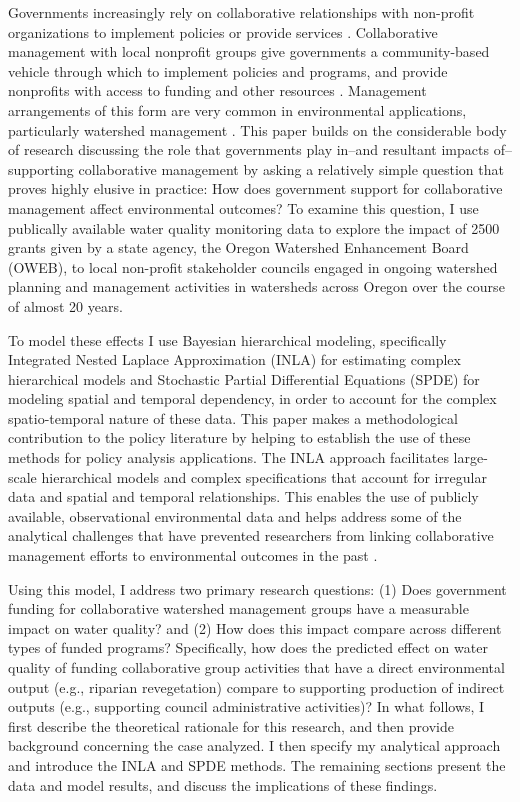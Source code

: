 \documentclass[11pt,a4paper,titlepage]{article}
\begin{document}
Governments increasingly rely on collaborative relationships with non-profit organizations to implement policies or provide services \parencite{salamon2002}. Collaborative management with local nonprofit groups give governments a community-based vehicle through which to implement policies and programs, and provide nonprofits with access to funding and other resources \parencite{nikolic2008}. Management arrangements of this form are very common in environmental applications, particularly watershed management \parencite[e.g.,][]{leach2013,leach2002,margerum2011}. This paper builds on the considerable body of research discussing the role that governments play in--and resultant impacts of--supporting collaborative management \parencite[e.g.,][]{nikolic2008,lubell2008,ansell2008,emerson2012} by asking a relatively simple question that proves highly elusive in practice: How does government support for collaborative management affect environmental outcomes? To examine this question, I use publically available water quality monitoring data to explore the impact of 2500 grants given by a state agency, the Oregon Watershed Enhancement Board (OWEB), to local non-profit stakeholder councils engaged in ongoing watershed planning and management activities in watersheds across Oregon over the course of almost 20 years.

To model these effects I use Bayesian hierarchical modeling, specifically Integrated Nested Laplace Approximation (INLA) \parencite{rue2009} for estimating complex hierarchical models and Stochastic Partial Differential Equations (SPDE) \parencite{lindgren2011} for modeling spatial and temporal dependency, in order to account for the complex spatio-temporal nature of these data. This paper makes a methodological contribution to the policy literature by helping to establish the use of these methods for policy analysis applications. The INLA approach facilitates large-scale hierarchical models and complex specifications that account for irregular data and spatial and temporal relationships. This enables the use of publicly available, observational environmental data and helps address some of the analytical challenges that have prevented researchers from linking collaborative management efforts to environmental outcomes in the past \parencite{koontz2006}.

Using this model, I address two primary research questions: (1) Does government funding for collaborative watershed management groups have a measurable impact on water quality? and (2) How does this impact compare across different types of funded programs? Specifically, how does the predicted effect on water quality of funding collaborative group activities that have a direct environmental output (e.g., riparian revegetation) compare to supporting production of indirect outputs (e.g., supporting council administrative activities)? In what follows, I first describe the theoretical rationale for this research, and then provide background concerning the case analyzed. I then specify my analytical approach and introduce the INLA and SPDE methods. The remaining sections present the data and model results, and discuss the implications of these findings.
\end{document}
